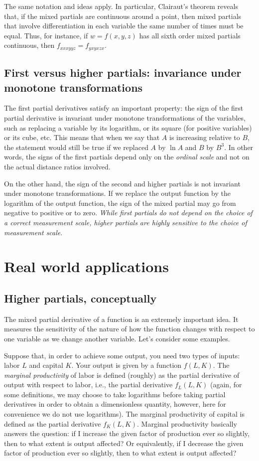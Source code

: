 \documentclass[10pt]{amsart}
\begin{document}
The same notation and ideas apply. In particular, Clairaut's theorem
reveals that, if the mixed partials are continuous around a point,
then mixed partials that involve differentiation in each variable the
same number of times must be equal. Thus, for instance, if $w =
f(x,y,z)$ has all sixth order mixed partials continuous, then
$f_{xxxyyz} = f_{yxyxzx}$.

\subsection{First versus higher partials: invariance under monotone transformations}

The first partial derivatives satisfy an important property: the sign
of the first partial derivative is invariant under monotone
transformations of the variables, such as replacing a variable by its
logarithm, or its square (for positive variables) or its cube,
etc. This means that when we say that $A$ is increasing relative to
$B$, the statement would still be true if we replaced $A$ by $\ln A$
and $B$ by $B^3$. In other words, the signs of the first partials
depend only on the {\em ordinal scale} and not on the actual distance
ratios involved.

On the other hand, the sign of the second and higher partials is not
invariant under monotone transformations. If we replace the output
function by the logarithm of the output function, the sign of the
mixed partial may go from negative to positive or to zero. {\em While
first partials do not depend on the choice of a correct measurement
scale, higher partials are highly sensitive to the choice of
measurement scale}.
\section{Real world applications}

\subsection{Higher partials, conceptually}
 
The mixed partial derivative of a function is an extremely important
idea. It measures the sensitivity of the nature of how the function
changes with respect to one variable as we change another
variable. Let's consider some examples.

Suppose that, in order to achieve some output, you need two types of
inputs: labor $L$ and capital $K$. Your output is given by a function
$f(L,K)$. The {\em marginal productivity} of labor is defined
(roughly) as the partial derivative of output with respect to labor,
i.e., the partial derivative $f_L(L,K)$ (again, for some definitions,
we may choose to take logarithms before taking partial derivatives in
order to obtain a dimensionless quantity, however, here for
convenience we do not use logarithms). The marginal productivity of
capital is defined as the partial derivative $f_K(L,K)$. Marginal
productivity basically answers the question: if I increase the given
factor of production ever so slightly, then to what extent is output
affected? Or equivalently, if I decrease the given factor of
production ever so slightly, then to what extent is output affected?
\end{document}
